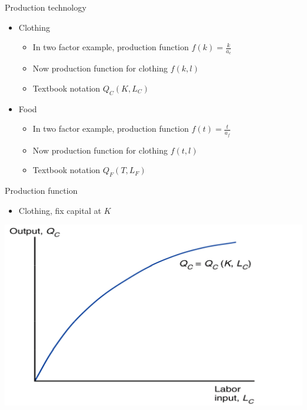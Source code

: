 \documentclass[ignorenonframetext,]{beamer}
\begin{document}
\begin{frame}{Production technology}

    \begin{itemize}
        \item Clothing
        \begin{itemize}
            \item In two factor example, production function $f(k) = \frac{k}{a_c}$
            \item Now production function for clothing $f(k,l)$
            \item Textbook notation $Q_C(K,L_C)$
        \end{itemize}
        \item Food
        \begin{itemize}
            \item In two factor example, production function $f(t) = \frac{t}{a_f}$
            \item Now production function for clothing $f(t,l)$
            \item Textbook notation $Q_F(T,L_F)$
        \end{itemize}
    \end{itemize}

\end{frame}

\begin{frame}{Production function}

    \begin{itemize}
        \item Clothing, fix capital at $K$
    \end{itemize}
    \includegraphics[scale=0.20]{cloth_prod.png}

\end{frame}
\end{document}
